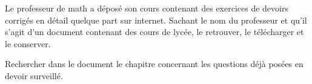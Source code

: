 
\begin{exercice}\label{exosmath-0539}

    Le professeur de math a déposé son cours contenant des exercices de devoirs corrigés en détail quelque part sur internet. Sachant le nom du professeur et qu'il s'agit d'un document  contenant des cours de lycée, le retrouver, le télécharger et le conserver.

    Rechercher dans le document le chapitre concernant les questions déjà posées en devoir surveillé.

\end{exercice}
